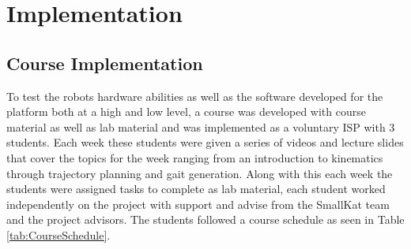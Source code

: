 \documentclass[12pt]{report}
\begin{document}
\chapter{Implementation}
\section{Course Implementation}
    To test the robots hardware abilities as well as the software developed for the platform both at a high and low level, a course was developed with course material as well as lab material and was implemented as a voluntary ISP with 3 students. Each week these students were given a series of videos and lecture slides that cover the topics for the week ranging from an introduction to kinematics through trajectory planning and gait generation.  Along with this each week the students were assigned tasks to complete as lab material, each student worked independently on the project with support and advise from the SmallKat team and the project advisors. The students followed a course schedule as seen in Table \ref{tab:CourseSchedule}. 
    
\end{document}
